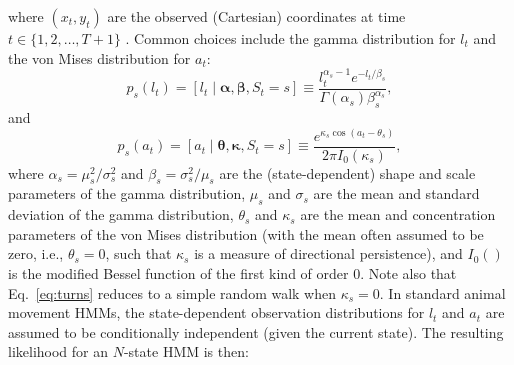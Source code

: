 \documentclass[12pt]{article}\usepackage[]{graphicx}\usepackage[]{xcolor}
\begin{document}
where $(x_t,y_t)$ are the observed (Cartesian) coordinates at time $t \in \{1,2,\ldots,T+1\}$ \citep[e.g.,][]{MoralesEtAl2004,LangrockEtAl2012,McClintockEtAl2012}. Common choices include the gamma distribution for $l_t$ and the von Mises distribution for $a_t$:
\begin{equation}
\label{eq:steps}
  p_s(l_t) = \left[l_t \mid \boldsymbol{\alpha}, \boldsymbol{\beta}, S_t = s \right] \equiv \frac{l_t^{\alpha_s-1} e^{-l_t / \beta_s}}{\Gamma\left(\alpha_s\right)\beta_s^{\alpha_s}},
\end{equation}
and
\begin{equation}
\label{eq:turns}
  p_s(a_t) = \left[a_t \mid \boldsymbol{\theta}, \boldsymbol{\kappa}, S_t = s \right] \equiv \frac{e^{\kappa_s \cos\left(a_t - \theta_s\right)}}{2 \pi I_0\left(\kappa_s\right)},
\end{equation}
where $\alpha_s=\mu^2_s / \sigma^2_s$ and $\beta_s=\sigma^2_s / \mu_s$ are the (state-dependent) shape and scale parameters of the gamma distribution, $\mu_s$ and $\sigma_s$ are the mean and standard deviation of the gamma distribution, $\theta_s$ and $\kappa_s$ are the mean and concentration parameters of the von Mises distribution (with the mean often assumed to be zero, i.e., $\theta_s=0$, such that $\kappa_s$ is a measure of directional persistence), and $I_0\left(\right)$ is the modified Bessel function of the first kind of order 0. Note also that Eq.\ \ref{eq:turns} reduces to a simple random walk when $\kappa_s=0$. In standard animal movement HMMs, the state-dependent observation distributions for $l_t$ and $a_t$ are assumed to be conditionally independent (given the current state). The resulting likelihood for an $N$-state HMM is then:
\end{document}
